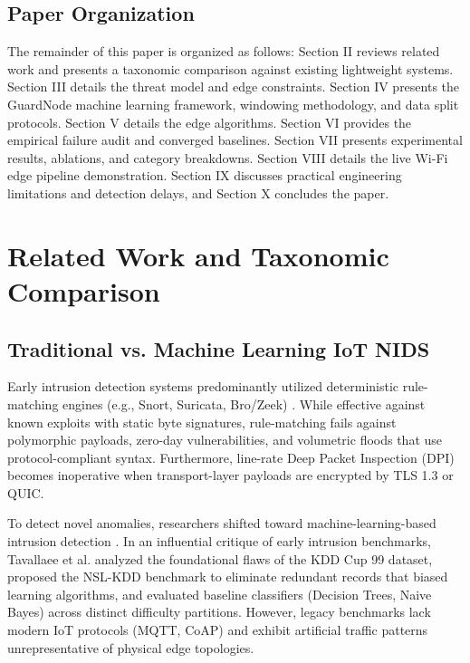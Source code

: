 \documentclass[conference]{IEEEtran}
\begin{document}
\subsection{Paper Organization}
The remainder of this paper is organized as follows: Section II reviews related work and presents a taxonomic comparison against existing lightweight systems. Section III details the threat model and edge constraints. Section IV presents the GuardNode machine learning framework, windowing methodology, and data split protocols. Section V details the edge algorithms. Section VI provides the empirical failure audit and converged baselines. Section VII presents experimental results, ablations, and category breakdowns. Section VIII details the live Wi-Fi edge pipeline demonstration. Section IX discusses practical engineering limitations and detection delays, and Section X concludes the paper.

\section{Related Work and Taxonomic Comparison}

\subsection{Traditional vs. Machine Learning IoT NIDS}
Early intrusion detection systems predominantly utilized deterministic rule-matching engines (e.g., Snort, Suricata, Bro/Zeek) \cite{ref_roesch}. While effective against known exploits with static byte signatures, rule-matching fails against polymorphic payloads, zero-day vulnerabilities, and volumetric floods that use protocol-compliant syntax. Furthermore, line-rate Deep Packet Inspection (DPI) becomes inoperative when transport-layer payloads are encrypted by TLS 1.3 or QUIC.

To detect novel anomalies, researchers shifted toward machine-learning-based intrusion detection \cite{ref_oliveira}. In an influential critique of early intrusion benchmarks, Tavallaee et al. \cite{ref_tavallaee} analyzed the foundational flaws of the KDD Cup 99 dataset, proposed the NSL-KDD benchmark to eliminate redundant records that biased learning algorithms, and evaluated baseline classifiers (Decision Trees, Naive Bayes) across distinct difficulty partitions. However, legacy benchmarks lack modern IoT protocols (MQTT, CoAP) and exhibit artificial traffic patterns unrepresentative of physical edge topologies.
\end{document}
